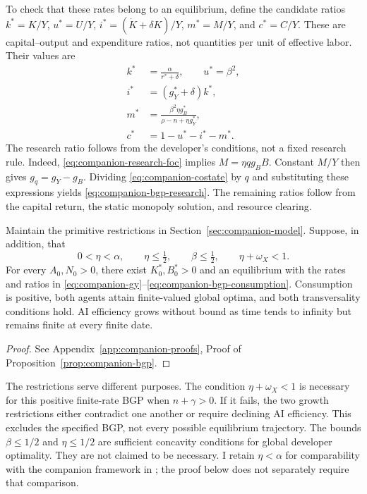 To check that these rates belong to an equilibrium, define the candidate
ratios $k^*=K/Y$, $u^*=U/Y$, $i^*=(\dot K+\delta K)/Y$, $m^*=M/Y$, and
$c^*=C/Y$. These are capital--output and expenditure ratios, not quantities
per unit of effective labor. Their values are
\begin{align}
 k^*&=\frac{\alpha}{r^*+\delta},\qquad u^*=\beta^2,
 \label{eq:companion-bgp-capital-inference}\\
 i^*&=(g_Y^*+\delta)k^*,\label{eq:companion-bgp-investment}\\
 m^*&=\frac{\beta^2\eta g_B^*}{\rho-n+\eta g_Y^*},
 \label{eq:companion-bgp-research}\\
 c^*&=1-u^*-i^*-m^*.\label{eq:companion-bgp-consumption}
\end{align}
The research ratio follows from the developer's conditions, not a fixed
research rule. Indeed, \eqref{eq:companion-research-foc} implies
$M=\eta qg_BB$. Constant $M/Y$ then gives $g_q=g_Y-g_B$. Dividing
\eqref{eq:companion-costate} by $q$ and substituting these expressions yields
\eqref{eq:companion-bgp-research}. The remaining ratios follow from the
capital return, the static monopoly solution, and resource clearing.

\begin{proposition}
\label{prop:companion-bgp}
Maintain the primitive restrictions in Section~\ref{sec:companion-model}.
Suppose, in addition, that
\begin{equation}
 0<\eta<\alpha,\qquad\eta\leq\tfrac12,\qquad
 \beta\leq\tfrac12,\qquad\eta+\omega_X<1.
 \label{eq:companion-sufficient}
\end{equation}
For every $A_0,N_0>0$, there exist $K_0^*,B_0^*>0$ and an equilibrium with
the rates and ratios in \eqref{eq:companion-gy}--\eqref{eq:companion-bgp-consumption}.
Consumption is positive, both agents attain finite-valued global optima,
and both transversality conditions hold. AI efficiency grows without bound
as time tends to infinity but remains finite at every finite date.
\end{proposition}
\begin{proof}
See Appendix~\ref{app:companion-proofs}, Proof of
Proposition~\ref{prop:companion-bgp}.
\end{proof}

The restrictions serve different purposes. The condition $\eta+\omega_X<1$
is necessary for this positive finite-rate BGP when $n+\gamma>0$.
If it fails, the two growth restrictions either contradict one another or
require declining AI efficiency. This excludes the specified BGP, not every
possible equilibrium trajectory. The bounds $\beta\leq1/2$ and $\eta\leq1/2$
are sufficient concavity conditions for global developer optimality. They
are not claimed to be necessary. I retain $\eta<\alpha$ for comparability
with the companion framework in \citet{pardo2026future}; the proof below
does not separately require that comparison.

